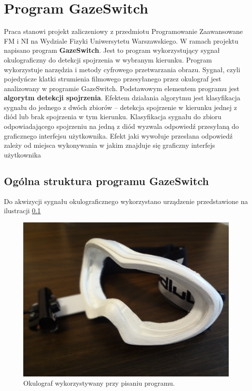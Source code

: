 \chapter*{Program GazeSwitch}
\label{rozdz6}

Praca stanowi projekt zaliczeniowy z przedmiotu Programowanie Zaawansowane FM i NI na Wydziale Fizyki Uniwersytetu Warszawskiego. W ramach projektu napisano program \textbf{GazeSwitch}. Jest to program wykorzystujący sygnał okulograficzny do detekcji spojrzenia w wybranym kierunku. Program wykorzystuje narzędzia i metody cyfrowego przetwarzania obrazu. Sygnał, czyli pojedyńcze klatki strumienia filmowego przesyłanego przez okulograf jest analizowany w programie GazeSwitch. Podstawowym elementem programu jest \textbf{algorytm detekcji spojrzenia}. Efektem działania algorytmu jest klasyfikacja sygnału do jednego z dwóch zbiorów -- detekcja spojrzenie w kierunku jednej z diód lub brak spojrzenia w tym kierunku. Klasyfikacja sygnału do zbioru odpowiadającego spojrzeniu na jedną z diód wyzwala odpowiedź przesyłaną do graficznego interfejsu użytkownika. Efekt jaki wywołuje przesłana odpowiedź zależy od miejsca wykonywania w jakim znajduje się graficzny interfejs użytkownika

\section{Ogólna struktura programu GazeSwitch}

Do akwizycji sygnału okulograficznego wykorzystano urządzenie przedstawione na ilustracji \ref{fig1}

\begin{figure}[h!]
\centering
\includegraphics[scale=0.04]{images/1.jpg}
\caption{Okulograf wykorzystywany przy pisaniu programu. \label{fig1}}
\end{figure}

